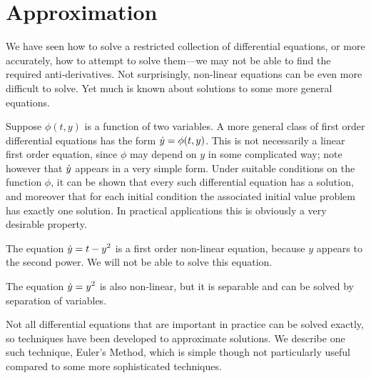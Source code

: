 \section{Approximation}{}{}
\nobreak
We have seen how to solve a restricted collection of differential
equations, or more  accurately, how to attempt to solve them---we may
not be able to find the required anti-derivatives. Not surprisingly,
non-linear equations can be even more difficult to solve. Yet much is
known about solutions to some more general equations.

Suppose $\phi(t,y)$ is a function of two variables. A more general
class of first order differential equations has the form $\displaystyle\dot
y=\phi(t,y)$. This is not necessarily a linear first order equation,
since $\phi$ may depend on $y$ in some complicated way; note however
that $\displaystyle\dot y$ appears in a very simple form. Under suitable
conditions on the function $\phi$, it can be shown that every such
differential equation has a solution, and moreover that for each
initial condition the associated initial value problem has exactly one
solution. In practical applications this is obviously a very desirable
property. 

\example The equation $\displaystyle\dot y=t-y^2$ is a first order non-linear
equation, because $y$ appears to the second power. We will not be able
to solve this equation.
\endexample

\example The equation $\displaystyle\dot y=y^2$ is also non-linear, but it is
separable and can be solved by separation of variables.
\endexample

Not all differential equations that are important in practice can be
solved exactly, so techniques have been developed to approximate
solutions. We describe one such technique, {\dfont Euler's
  Method}, which is simple though not particularly
useful compared to some more sophisticated techniques.

